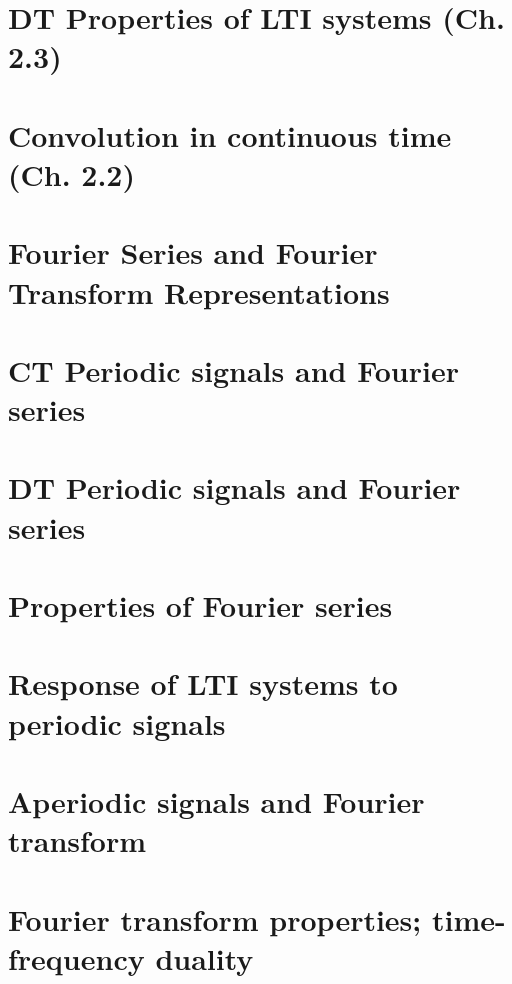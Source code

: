 \documentclass{article}
\begin{document}
\section{DT Properties of LTI systems (Ch. 2.3)} %

\newpage

\section{Convolution in continuous time (Ch. 2.2)}

\newpage

\section*{Fourier Series and Fourier Transform Representations}
\section{CT Periodic signals and Fourier series}

\newpage

\section{DT Periodic signals and Fourier series}

\newpage

\section{Properties of Fourier series}

\newpage

\section{Response of LTI systems to periodic signals}

\newpage

\section{Aperiodic signals and Fourier transform}
\newpage

\section{Fourier transform properties; time-frequency duality}
\newpage
\end{document}
